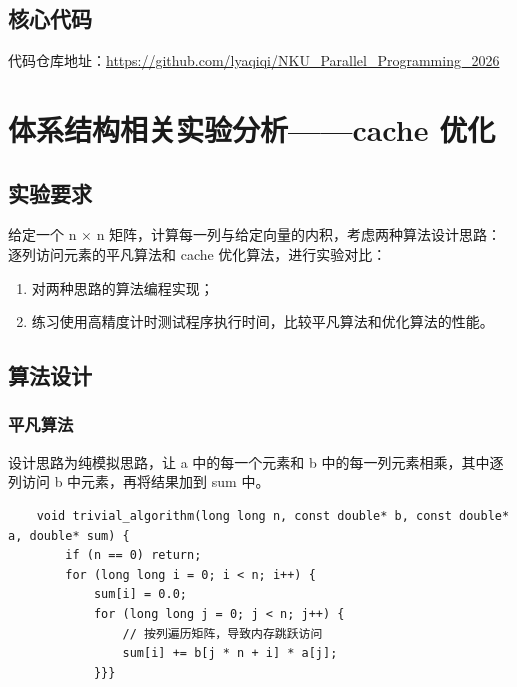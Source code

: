 \documentclass[a4paper]{article}
\begin{document}
\subsection{核心代码}
代码仓库地址：\href{https://github.com/lyaqiqi/NKU_Parallel_Programming_2026}{https://github.com/lyaqiqi/NKU\_Parallel\_Programming\_2026}

\section{体系结构相关实验分析——cache 优化}
\subsection{实验要求}
给定一个 n × n 矩阵，计算每一列与给定向量的内积，考虑两种算法设计思路：逐列访问元素的平凡算法和 cache 优化算法，进行实验对比：
\begin{enumerate}
  \item 对两种思路的算法编程实现；
  \item 练习使用高精度计时测试程序执行时间，比较平凡算法和优化算法的性能。
\end{enumerate}

\subsection{算法设计}
\subsubsection{平凡算法}
设计思路为纯模拟思路，让 a 中的每一个元素和 b 中的每一列元素相乘，其中逐列访问 b 中元素，再将结果加到 sum 中。
\begin{verbatim}
    void trivial_algorithm(long long n, const double* b, const double* a, double* sum) {
        if (n == 0) return;
        for (long long i = 0; i < n; i++) {
            sum[i] = 0.0;
            for (long long j = 0; j < n; j++) {
                // 按列遍历矩阵，导致内存跳跃访问
                sum[i] += b[j * n + i] * a[j];
            }}}
\end{verbatim}
\end{document}
